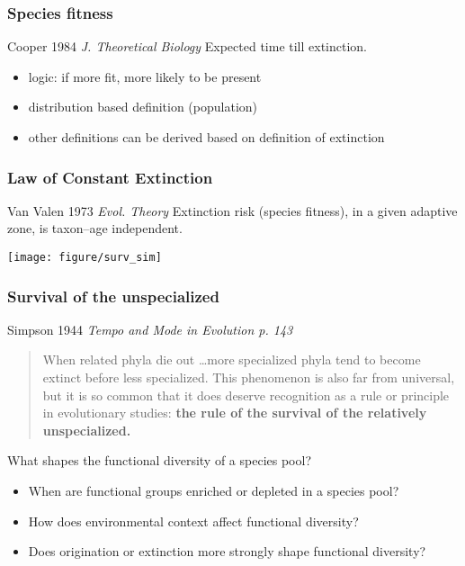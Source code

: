 \documentclass{beamer}
\begin{document}
\begin{frame}
  \frametitle{Species fitness}

  \begin{block}{Cooper 1984 \em{J. Theoretical Biology}}
    Expected time till extinction.
  \end{block}


  \begin{itemize}
    \item \alert{logic:} if more fit, more likely to be present
    \item distribution based definition (population)
    \item other definitions can be derived based on definition of extinction
  \end{itemize}

\end{frame}

\begin{frame}
  \frametitle{Law of Constant Extinction}

  \begin{block}{Van Valen 1973 \em{Evol. Theory}}
    Extinction risk (species fitness), in a given adaptive zone, is taxon--age independent.
  \end{block}

  \begin{center}
    \texttt{[image: figure/surv\_sim]}

  \end{center}

\end{frame}

\begin{frame}
  \frametitle{Survival of the unspecialized}
  \begin{block}{Simpson 1944 \em{Tempo and Mode in Evolution} p. 143}
    \begin{quote}
      When related phyla die out \dots more specialized phyla tend to become extinct before less specialized. This phenomenon is also far from universal, but it is so common that it does deserve recognition as a rule or principle in evolutionary studies: \textbf{the rule of the survival of the relatively unspecialized.}
    \end{quote}
  \end{block}
\end{frame}




\begin{frame}
  \begin{alertblock}{What shapes the functional diversity of a species pool?}
    \begin{itemize}
      \item When are functional groups enriched or depleted in a species pool? 
      \item How does environmental context affect functional diversity?
      \item Does origination or extinction more strongly shape functional diversity?
    \end{itemize}
  \end{alertblock}
\end{frame}
\end{document}

